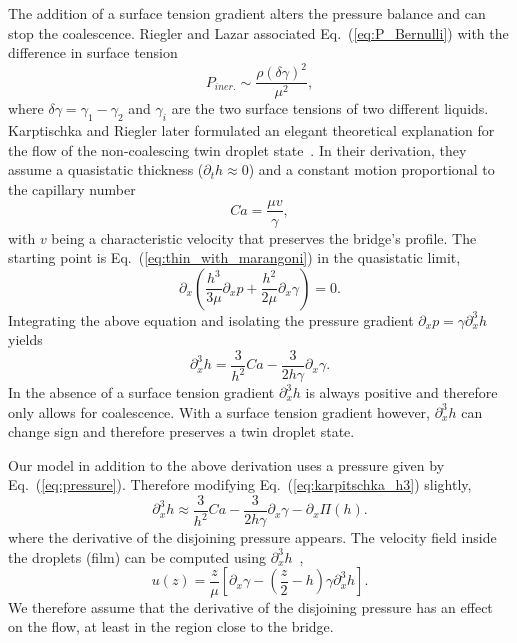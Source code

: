 \documentclass[twocolumn,amsmath,amssymb,showpacs,pre,nofootinbib,superscriptaddress]{revtex4-1} %
\begin{document}
The addition of a surface tension gradient alters the pressure balance and can stop the coalescence.
Riegler and Lazar associated Eq.~(\ref{eq:P_Bernulli}) with the difference in surface tension~\cite{doi:10.1021/la800630w}
\begin{equation}\label{eq:P_bernulli_riegler}
    P_{iner.} \sim \frac{\rho (\delta\gamma)^2}{\mu^2}, 
\end{equation}
where $\delta\gamma = \gamma_1 - \gamma_2$ and $\gamma_i$ are the two surface tensions of two different liquids. 
Karptischka and Riegler later formulated an elegant theoretical explanation for the flow of the non-coalescing twin droplet state~\cite{PhysRevLett.109.066103}.
In their derivation, they assume a quasistatic thickness ($\partial_t h \approx 0$) and a constant motion proportional to the capillary number 
\begin{equation}\label{eq:sys_cap_vel}
    Ca = \frac{\mu v}{\gamma},
\end{equation} 
with $v$ being a characteristic velocity that preserves the bridge's profile. 
The starting point is Eq.~(\ref{eq:thin_with_marangoni}) in the quasistatic limit, 
\begin{equation}\label{eq:pressure_noncoal}
    \partial_x\left(\frac{h^3}{3\mu}\partial_x p + \frac{h^2}{2\mu}\partial_x\gamma\right) = 0.
\end{equation}
Integrating the above equation and isolating the pressure gradient $\partial_x p = \gamma\partial_x^3 h$ yields~\cite{RevModPhys.69.931, PhysRevLett.109.066103}
\begin{equation}\label{eq:karpitschka_h3}
    \partial_x^3 h = \frac{3}{h^2}Ca - \frac{3}{2h\gamma}\partial_x\gamma.
\end{equation}
In the absence of a surface tension gradient $\partial_x^3 h$ is always positive and therefore only allows for coalescence.
With a surface tension gradient however, $\partial_x^3 h$ can change sign and therefore preserves a twin droplet state\cite{PhysRevLett.109.066103}.

Our model in addition to the above derivation uses a pressure given by Eq.~(\ref{eq:pressure}).
Therefore modifying Eq.~(\ref{eq:karpitschka_h3}) slightly, 
\begin{equation}\label{eq:stefan_h3}
    \partial_x^3 h \approx \frac{3}{h^2}Ca - \frac{3}{2h\gamma}\partial_x\gamma - \partial_x\Pi(h).
\end{equation}
where the derivative of the disjoining pressure appears. 
The velocity field inside the droplets (film) can be computed using $\partial_x^3 h$~\cite{RevModPhys.69.931},
\begin{equation}\label{eq:Oron_correct}
    u(z) = \frac{z}{\mu}\left[\partial_x\gamma - \left(\frac{z}{2} - h\right)\gamma\partial_x^3 h\right].
\end{equation}
We therefore assume that the derivative of the disjoining pressure has an effect on the flow, at least in the region close to the bridge.
\end{document}
